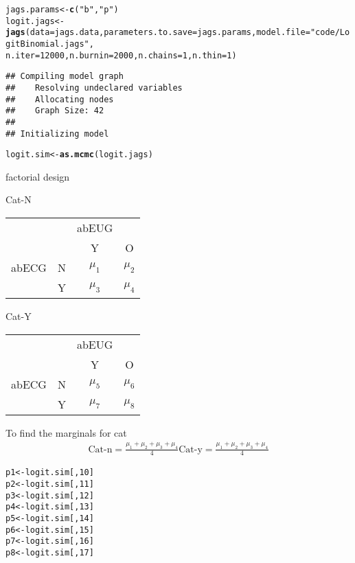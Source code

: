 \documentclass[12pt,letterpaper,oneside]{article}\usepackage{graphicx, color}
\makeatletter
\newcommand{\hlfunctioncall}[1]{\textcolor[rgb]{0.501960784313725,0,0.329411764705882}{\textbf{#1}}}%
\newcommand{\hlstring}[1]{\textcolor[rgb]{0.6,0.6,1}{#1}}%
\newenvironment{kframe}{%
 \def\at@end@of@kframe{}%
 \ifinner\ifhmode%
  \def\at@end@of@kframe{\end{minipage}}%
  \begin{minipage}{\columnwidth}%
 \fi\fi%
 \def\FrameCommand##1{\hskip\@totalleftmargin \hskip-\fboxsep
 \colorbox{shadecolor}{##1}\hskip-\fboxsep
     \hskip-\linewidth \hskip-\@totalleftmargin \hskip\columnwidth}%
 \MakeFramed {\advance\hsize-\width
   \@totalleftmargin\z@ \linewidth\hsize
   \@setminipage}}%
 {\par\unskip\endMakeFramed%
 \at@end@of@kframe}
\newenvironment{knitrout}{}{} %
\makeatother
\begin{document}
\begin{knitrout}\scriptsize
{}\color{fgcolor}\begin{kframe}
\begin{alltt}
jags.params <- \hlfunctioncall{c}(\hlstring{"b"}, \hlstring{"p"})
logit.jags <- \hlfunctioncall{jags}(data = jags.data, parameters.to.save = jags.params, model.file = \hlstring{"code/LogitBinomial.jags"}, 
    n.iter = 12000, n.burnin = 2000, n.chains = 1, n.thin = 1)
\end{alltt}
\begin{verbatim}
## Compiling model graph
##    Resolving undeclared variables
##    Allocating nodes
##    Graph Size: 42
## 
## Initializing model
\end{verbatim}
\begin{alltt}
logit.sim <- \hlfunctioncall{as.mcmc}(logit.jags)
\end{alltt}
\end{kframe}
\end{knitrout}

factorial design 

Cat-N
\begin{tabular}{cccc}
      &  & abEUG & \\
      &  & Y & O\\
abECG & N & $\mu_1$ & $\mu_2$ \\
      & Y & $\mu_3$ & $\mu_4$ \\
\end{tabular}

Cat-Y
\begin{tabular}{cccc}
      &  & abEUG & \\
      &  & Y & O\\
abECG & N & $\mu_5$ & $\mu_6$ \\
      & Y & $\mu_7$ & $\mu_8$ \\
\end{tabular}

To find the marginals for cat
\begin{align}
    \text{Cat-n} = \frac{\mu_1+\mu_2+\mu_3+\mu_4}{4}
    \text{Cat-y} = \frac{\mu_1+\mu_2+\mu_3+\mu_4}{4}
\end{align}
\begin{knitrout}\scriptsize
{}\color{fgcolor}\begin{kframe}
\begin{alltt}
p1 <- logit.sim[, 10]
p2 <- logit.sim[, 11]
p3 <- logit.sim[, 12]
p4 <- logit.sim[, 13]
p5 <- logit.sim[, 14]
p6 <- logit.sim[, 15]
p7 <- logit.sim[, 16]
p8 <- logit.sim[, 17]
\end{alltt}
\end{kframe}
\end{knitrout}
\end{document}
